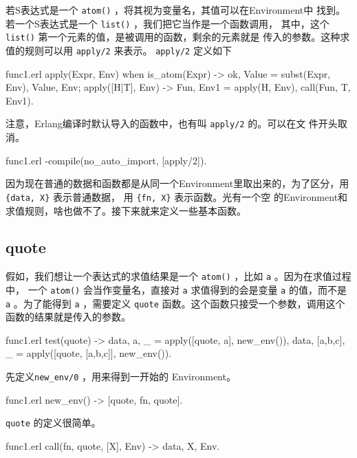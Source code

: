 \documentclass[preview,multi,crop=false,border=1in,class=memoir]{standalone}
\begin{document}
\begin{preview-page}
\nonzeroparskip

若S表达式是一个 \verb|atom()| ，将其视为变量名，其值可以在Environment中
找到。若一个S表达式是一个 \verb|list()| ，我们把它当作是一个函数调用，
其中，这个 \verb|list()| 第一个元素的值，是被调用的函数，剩余的元素就是
传入的参数。这种求值的规则可以用 \verb|apply/2| 来表示。
\verb|apply/2| 定义如下

\begin{SourceCode}[15][21]{func1.erl}
apply(Expr, Env)
  when is_atom(Expr) ->
    {ok, Value} = subst(Expr, Env),
    {Value, Env};
apply([H|T], Env) ->
    {Fun, Env1} = apply(H, Env),
    call(Fun, T, Env1).
\end{SourceCode}

注意，Erlang编译时默认导入的函数中，也有叫 \verb|apply/2| 的。可以在文
件开头取消。

\begin{SourceCode}[2][2]{func1.erl}
-compile({no_auto_import, [apply/2]}).
\end{SourceCode}

因为现在普通的数据和函数都是从同一个Environment里取出来的，为了区分，用
\verb|{data, X}| 表示普通数据， 用 \verb|{fn, X}| 表示函数。光有一个空
的Environment和求值规则，啥也做不了。接下来就来定义一些基本函数。

\subsection{quote}

假如，我们想让一个表达式的求值结果是一个 \verb|atom()| ，比如 \verb|a|
。因为在求值过程中， 一个 \verb|atom()| 会当作变量名，直接对 \verb|a|
求值得到的会是变量 \verb|a| 的值，而不是 \verb|a| 。为了能得到
\verb|a| ，需要定义 \verb|quote| 函数。这个函数只接受一个参数，调用这个
函数的结果就是传入的参数。

\begin{SourceCode}[32][36]{func1.erl}
test(quote) ->
    {{data, a}, _} =
        apply([quote, a], new_env()),
    {{data, [a,b,c]}, _} =
        apply([quote, [a,b,c]], new_env()).
\end{SourceCode}

先定义\verb|new_env/0| ，用来得到一开始的 Environment。

\begin{SourceCode}[28][29]{func1.erl}
new_env() ->
    [{quote, {fn, quote}}].
\end{SourceCode}

\verb|quote| 的定义很简单。

\begin{SourceCode}[24][25]{func1.erl}
call({fn, quote}, [X], Env) ->
    {{data, X}, Env}.
\end{SourceCode}


\end{preview-page}
\end{document}
